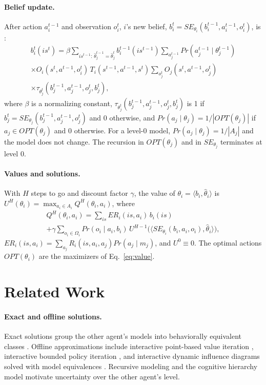 \documentclass{article}
\newcommand{\SE}{\mathit{SE}}
\newcommand{\ER}{\mathit{ER}}
\newcommand{\OPT}{\mathit{OPT}}
\newcommand{\hth}{\hat{\theta}}
\renewcommand{\Pr}{\mathit{Pr}}
\begin{document}
\paragraph{Belief update.} After action $a_i^{t-1}$ and observation $o_i^t$, $i$'s new belief, $b_i^t = \SE_{\theta_i}(b_i^{t-1}, a_i^{t-1}, o_i^t)$, is \cite{gmytrasiewicz2005framework}:
\begin{multline}
b_i^t(is^t) = \beta \!\!\sum_{is^{t-1}:\, \hth_j^{t-1} = \hth_j^t}\!\! b_i^{t-1}(is^{t-1}) \sum_{a_j^{t-1}} \Pr(a_j^{t-1} \mid \theta_j^{t-1})\\
\times O_i(s^t, a^{t-1}, o_i^t)\, T_i(s^{t-1}, a^{t-1}, s^t) \sum_{o_j^t} O_j(s^t, a^{t-1}, o_j^t)\\
\times \tau_{\theta_j^t}(b_j^{t-1}, a_j^{t-1}, o_j^t, b_j^t),
\label{eq:update}
\end{multline}
where $\beta$ is a normalizing constant, $\tau_{\theta_j^t}(b_j^{t-1}, a_j^{t-1}, o_j^t, b_j^t)$ is 1 if $b_j^t = \SE_{\theta_j}(b_j^{t-1}, a_j^{t-1}, o_j^t)$ and 0 otherwise, and $\Pr(a_j \mid \theta_j) = 1/|\OPT(\theta_j)|$ if $a_j \in \OPT(\theta_j)$ and 0 otherwise. For a level-0 model, $\Pr(a_j \mid \theta_j) = 1/|A_j|$ and the model does not change. The recursion in $\OPT(\theta_j)$ and in $\SE_{\theta_j}$ terminates at level 0.

\paragraph{Values and solutions.} With $H$ steps to go and discount factor $\gamma$, the value of $\theta_i = \langle b_i, \hth_i \rangle$ is $U^H(\theta_i) = \max_{a_i \in A_i} Q^H(\theta_i, a_i)$, where
\begin{multline}
Q^H(\theta_i, a_i) = \sum_{is} \ER_i(is, a_i)\, b_i(is)\\
+ \gamma \sum_{o_i \in \Omega_i} \Pr(o_i \mid a_i, b_i)\, U^{H-1}\big(\langle \SE_{\theta_i}(b_i, a_i, o_i), \hth_i \rangle\big),
\label{eq:value}
\end{multline}
$\ER_i(is, a_i) = \sum_{a_j} R_i(is, a_i, a_j) \Pr(a_j \mid m_j)$, and $U^0 \equiv 0$. The optimal actions $\OPT(\theta_i)$ are the maximizers of Eq.~\ref{eq:value}.

\section{Related Work}
\label{sec:related}

\paragraph{Exact and offline solutions.} Exact solutions group the other agent's models into behaviorally equivalent classes \cite{rathnasabapathy2006exact}. Offline approximations include interactive point-based value iteration \cite{doshi2008generalized}, interactive bounded policy iteration \cite{sonu2015scalable}, and interactive dynamic influence diagrams solved with model equivalences \cite{zeng2012exploiting}. Recursive modeling \cite{gmytrasiewicz2000rational} and the cognitive hierarchy model \cite{camerer2004cognitive} motivate uncertainty over the other agent's level.
\end{document}
